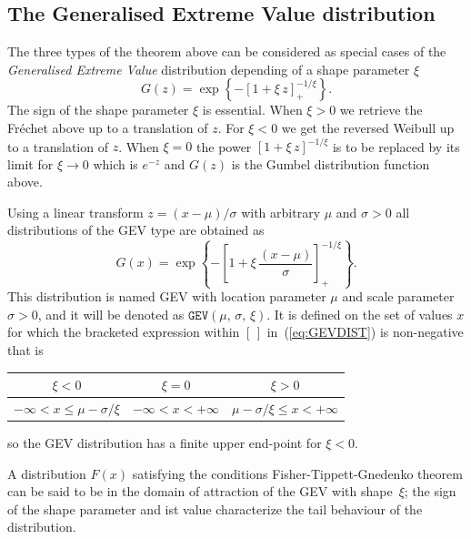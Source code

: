 \documentclass[a4paper]{report}
\begin{document}

\subsection{The Generalised Extreme Value distribution}
The three types of the theorem above can be considered as special cases of the 
\textit{Generalised Extreme Value} distribution
depending of a shape parameter $\xi$
$$
   G(z) = \exp\left\{ - \left[1 + \xi \, z \right]^{-1/\xi}_+ \right\}.
$$
The sign of the shape parameter $\xi$ is essential.
When $\xi>0$ we retrieve the Fr\'echet above up to a translation of $z$. 
For  $\xi<0$ we get the reversed Weibull  up to a translation of $z$.
When $\xi=0$ the power $\left[1 + \xi \, z \right]^{-1/\xi}$ is to be replaced 
by its limit for $\xi \rightarrow 0$ which is
$e^{-z}$ and $G(z)$ is the Gumbel distribution function above.

Using a linear transform $z=(x-\mu)/\sigma$ with arbitrary $\mu$ and  
$\sigma>0$ all distributions of the GEV type are obtained as
\begin{equation}
  \label{eq:GEVDIST}
  G(x) = 
  \exp\left\{ - \left[1 + \xi \, 
      \frac{(x-\mu)}{\sigma} \right]^{-1/\xi}_+ \right\}.
\end{equation}
This distribution is named GEV with location parameter $\mu$ and scale parameter 
$\sigma>0$, and it will be denoted as $\texttt{GEV}(\mu,\,\sigma,\,\xi)$. It
is defined on the set of values $x$ for which the bracketed expression within $[\,]$ 
in~(\ref{eq:GEVDIST}) is non-negative that is
\begin{center}
  \small
  \begin{tabular}{c | c | c}
    $\xi < 0$ & $\xi = 0$ & $\xi >0$ \\ \hline
   \rule{0pt}{11pt} $-\infty <  x \leqslant  \mu- \sigma/\xi$ &
    $-\infty <  x < +\infty$ &
    $\mu- \sigma/\xi \leqslant  x  < +\infty$ 
  \end{tabular}
\end{center}
so the GEV distribution has a finite upper end-point for $\xi < 0$.

A distribution $F(x)$ satisfying the conditions
Fisher-Tippett-Gnedenko theorem can be said to be in the domain of
attraction of the GEV with shape~$\xi$; the sign of the shape
parameter and ist value characterize the tail behaviour of the
distribution.  
\end{document}
